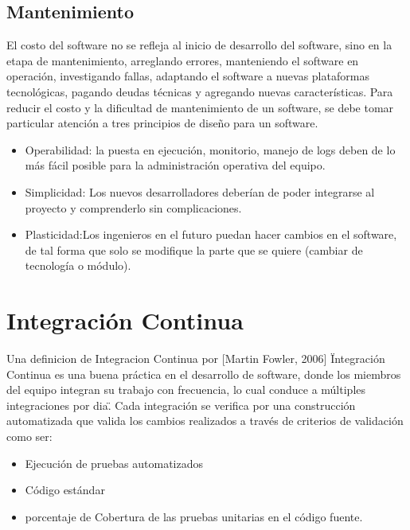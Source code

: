 \subsection{Mantenimiento}
\noindent El costo del software no se refleja al inicio de desarrollo del software, sino en la etapa de mantenimiento, arreglando errores, manteniendo el software en operación, investigando fallas, adaptando el software a nuevas plataformas tecnológicas, pagando deudas técnicas y agregando nuevas características.
Para reducir el costo y la dificultad de mantenimiento de un software, se debe tomar particular atención a tres principios de diseño para un software.
\begin{itemize}
\item Operabilidad: la puesta en ejecución, monitorio, manejo de logs deben de lo más fácil posible para la administración operativa del equipo.
\item Simplicidad: Los nuevos desarrolladores deberían de poder integrarse al proyecto y comprenderlo sin complicaciones.
\item Plasticidad:Los ingenieros en el futuro puedan hacer cambios en el software, de tal forma que solo se modifique la parte que se quiere (cambiar de tecnología o módulo).
\end{itemize}

\section{Integración Continua}
\noindent Una definicion de Integracion Continua por [Martin Fowler, 2006] \"Integración Continua es una buena práctica en el desarrollo de software, donde los miembros del equipo integran su trabajo con frecuencia, lo cual conduce a múltiples integraciones por dia\". Cada integración se verifica por una construcción automatizada que valida los cambios realizados a través de criterios de validación como ser:
\begin{itemize}
\item Ejecución de pruebas automatizados
\item Código estándar
\item porcentaje de Cobertura de las pruebas unitarias en el código fuente.
\end{itemize}

